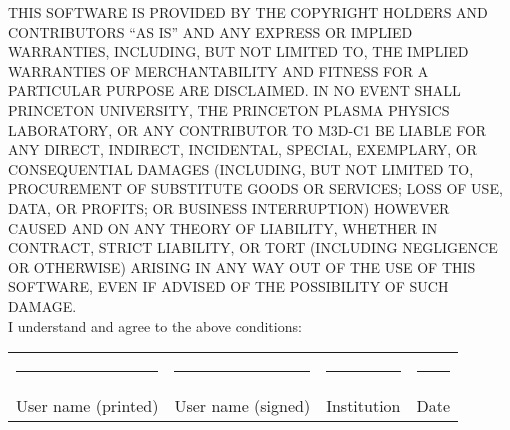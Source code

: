 \documentclass[10pt]{article}
\begin{document}
\noindent
THIS SOFTWARE IS PROVIDED BY THE COPYRIGHT HOLDERS AND CONTRIBUTORS
``AS IS'' AND ANY EXPRESS OR IMPLIED WARRANTIES, INCLUDING, BUT NOT
LIMITED TO, THE IMPLIED WARRANTIES OF MERCHANTABILITY AND FITNESS FOR
A PARTICULAR PURPOSE ARE DISCLAIMED. IN NO EVENT SHALL PRINCETON
UNIVERSITY, THE PRINCETON PLASMA PHYSICS LABORATORY, OR ANY
CONTRIBUTOR TO M3D-C1 BE LIABLE FOR ANY DIRECT, INDIRECT, INCIDENTAL,
SPECIAL, EXEMPLARY, OR CONSEQUENTIAL DAMAGES (INCLUDING, BUT NOT
LIMITED TO, PROCUREMENT OF SUBSTITUTE GOODS OR SERVICES; LOSS OF USE,
DATA, OR PROFITS; OR BUSINESS INTERRUPTION) HOWEVER CAUSED AND ON ANY
THEORY OF LIABILITY, WHETHER IN CONTRACT, STRICT LIABILITY, OR TORT
(INCLUDING NEGLIGENCE OR OTHERWISE) ARISING IN ANY WAY OUT OF THE USE
OF THIS SOFTWARE, EVEN IF ADVISED OF THE POSSIBILITY OF SUCH DAMAGE.\\

\noindent
I understand and agree to the above conditions:

\vspace{1.5cm}

\noindent
\begin{tabular}{llll}
\rule{4.5cm}{1pt} & \rule{4.5cm}{1pt} & \rule{4.5cm}{1pt} & \rule{2.5cm}{1pt} \\
User name (printed) & User name (signed) & Institution & Date\\
\end{tabular}
\end{document}
